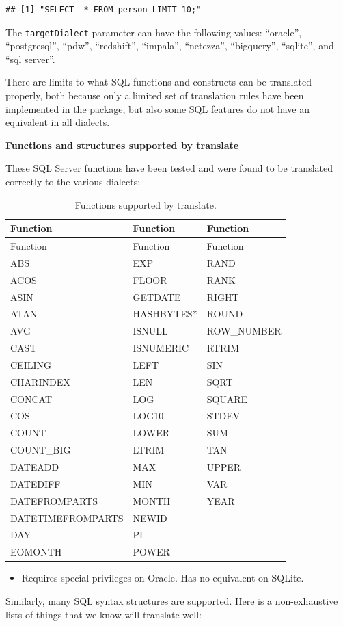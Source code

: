 \documentclass[]{book}
\providecommand{\tightlist}{%
  \setlength{\itemsep}{0pt}\setlength{\parskip}{0pt}}
\begin{document}
\begin{verbatim}
## [1] "SELECT  * FROM person LIMIT 10;"
\end{verbatim}

The \texttt{targetDialect} parameter can have the following values:
``oracle'', ``postgresql'', ``pdw'', ``redshift'', ``impala'',
``netezza'', ``bigquery'', ``sqlite'', and ``sql server''.

There are limits to what SQL functions and constructs can be translated
properly, both because only a limited set of translation rules have been
implemented in the package, but also some SQL features do not have an
equivalent in all dialects.

\textbf{Functions and structures supported by translate}

These SQL Server functions have been tested and were found to be
translated correctly to the various dialects:

\begin{longtable}[]{@{}lll@{}}
\caption{\label{tab:sqlFunctions} Functions supported by
translate.}\tabularnewline
\toprule
Function & Function & Function\tabularnewline
\midrule
\endfirsthead
\toprule
Function & Function & Function\tabularnewline
\midrule
\endhead
ABS & EXP & RAND\tabularnewline
ACOS & FLOOR & RANK\tabularnewline
ASIN & GETDATE & RIGHT\tabularnewline
ATAN & HASHBYTES* & ROUND\tabularnewline
AVG & ISNULL & ROW\_NUMBER\tabularnewline
CAST & ISNUMERIC & RTRIM\tabularnewline
CEILING & LEFT & SIN\tabularnewline
CHARINDEX & LEN & SQRT\tabularnewline
CONCAT & LOG & SQUARE\tabularnewline
COS & LOG10 & STDEV\tabularnewline
COUNT & LOWER & SUM\tabularnewline
COUNT\_BIG & LTRIM & TAN\tabularnewline
DATEADD & MAX & UPPER\tabularnewline
DATEDIFF & MIN & VAR\tabularnewline
DATEFROMPARTS & MONTH & YEAR\tabularnewline
DATETIMEFROMPARTS & NEWID &\tabularnewline
DAY & PI &\tabularnewline
EOMONTH & POWER &\tabularnewline
\bottomrule
\end{longtable}

\begin{itemize}
\tightlist
\item
  Requires special privileges on Oracle. Has no equivalent on SQLite.
\end{itemize}

Similarly, many SQL syntax structures are supported. Here is a
non-exhaustive lists of things that we know will translate well:
\end{document}
